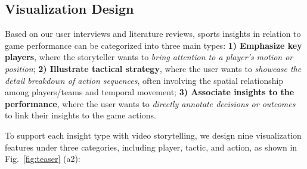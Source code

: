 \subsection{Visualization Design}
\label{sec:vis-feature}

Based on our user interviews and literature reviews, sports insights in relation to game performance can be categorized into three main types: 
\textbf{1) Emphasize key players}, where the storyteller wants to \textit{bring attention to a player's motion or position};
\textbf{2) Illustrate tactical strategy}, where the user wants to \textit{showcase the detail breakdown of action sequences}, often involving the spatial relationship among players/teams and temporal movement;
\textbf{3) Associate insights to the performance}, where the user wants to \textit{directly annotate decisions or outcomes} to link their insights to the game actions.

To support each insight type with video storytelling, we design nine visualization features under three categories, including player, tactic, and action, as shown in Fig.~\ref{fig:teaser} (a2):

